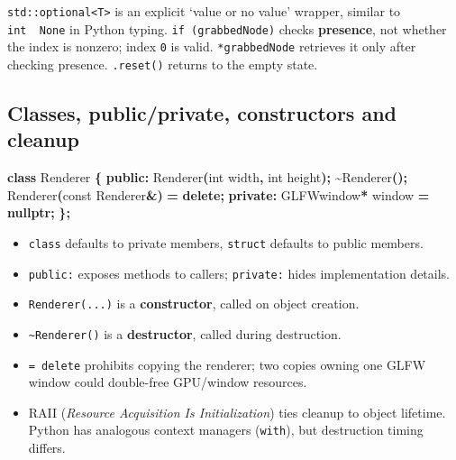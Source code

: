 \documentclass[
  10pt,
  a4paper,
]{article}
\newenvironment{Shaded}{\begin{snugshade}}{\end{snugshade}}
\newcommand{\AttributeTok}[1]{\textcolor[rgb]{0.13,0.29,0.53}{#1}}
\newcommand{\DataTypeTok}[1]{\textcolor[rgb]{0.13,0.29,0.53}{#1}}
\newcommand{\KeywordTok}[1]{\textcolor[rgb]{0.13,0.29,0.53}{\textbf{#1}}}
\newcommand{\NormalTok}[1]{#1}
\newcommand{\OperatorTok}[1]{\textcolor[rgb]{0.81,0.36,0.00}{\textbf{#1}}}
\providecommand{\tightlist}{%
  \setlength{\itemsep}{0pt}\setlength{\parskip}{0pt}}
\begin{document}
\texttt{std::optional\textless{}T\textgreater{}} is an explicit `value
or no value' wrapper, similar to \texttt{int\ \textbar{}\ None} in
Python typing. \texttt{if\ (grabbedNode)} checks \textbf{presence}, not
whether the index is nonzero; index \texttt{0} is valid.
\texttt{*grabbedNode} retrieves it only after checking presence.
\texttt{.reset()} returns to the empty state.

\subsection{Classes, public/private, constructors and
cleanup}\label{classes-publicprivate-constructors-and-cleanup}

\begin{Shaded}
\begin{Highlighting}[]
\KeywordTok{class}\NormalTok{ Renderer }\OperatorTok{\{}
\KeywordTok{public}\OperatorTok{:}
\NormalTok{    Renderer}\OperatorTok{(}\DataTypeTok{int}\NormalTok{ width}\OperatorTok{,} \DataTypeTok{int}\NormalTok{ height}\OperatorTok{);}
    \OperatorTok{\textasciitilde{}}\NormalTok{Renderer}\OperatorTok{();}
\NormalTok{    Renderer}\OperatorTok{(}\AttributeTok{const}\NormalTok{ Renderer}\OperatorTok{\&)} \OperatorTok{=} \KeywordTok{delete}\OperatorTok{;}
\KeywordTok{private}\OperatorTok{:}
\NormalTok{    GLFWwindow}\OperatorTok{*}\NormalTok{ window }\OperatorTok{=} \KeywordTok{nullptr}\OperatorTok{;}
\OperatorTok{\};}
\end{Highlighting}
\end{Shaded}

\begin{itemize}
\tightlist
\item
  \texttt{class} defaults to private members, \texttt{struct} defaults
  to public members.
\item
  \texttt{public:} exposes methods to callers; \texttt{private:} hides
  implementation details.
\item
  \texttt{Renderer(...)} is a \textbf{constructor}, called on object
  creation.
\item
  \texttt{\textasciitilde{}Renderer()} is a \textbf{destructor}, called
  during destruction.
\item
  \texttt{=\ delete} prohibits copying the renderer; two copies owning
  one GLFW window could double-free GPU/window resources.
\item
  RAII (\emph{Resource Acquisition Is Initialization}) ties cleanup to
  object lifetime. Python has analogous context managers
  (\texttt{with}), but destruction timing differs.
\end{itemize}
\end{document}
